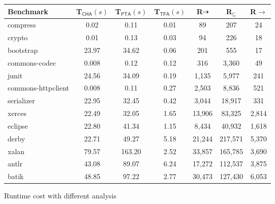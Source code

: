 \documentclass[runningheads]{llncs}
\newcommand{\less}{\sqsubseteq}
\newcommand{\tflow}{\dashrightarrow}
\begin{document}
\begin{figure}[t!]\centering
\begin{tabular}{lcccccc}
	\hline
	\textbf{Benchmark} & \hspace{5pt}\textbf{T$_{\textsf{CHA}}(s)$} & \hspace{5pt}\textbf{T$_{\textsf{PTA}}(s)$} & \hspace{5pt}\textbf{T$_{\textsf{TFA}}(s)$} & \hspace{5pt}\textbf{R${\tflow}$}\hspace{5pt} & \hspace{5pt}\textbf{R$_{\less}$}\hspace{5pt} & \hspace{5pt}\textbf{R${\rightarrow}$} \hspace{2pt}\\
	\hline
	compress & 0.02 & 0.11 & 0.01 & 89 & 207 & 24\\
	crypto & 0.01 & 0.13 & 0.03 & 94 & 226 & 18\\
	bootstrap & 23.97 & 34.62 & 0.06 & 201 & 555 & 17\\
	commons-codec & 0.008 & 0.12 & 0.12 & 316 & 3,360 & 49\\
	junit & 24.56 & 34.09 & 0.19 & 1,135 & 5,977 & 241\\
	commons-httpclient & 0.008 & 0.11 & 0.27 & 2,503 & 8,836 & 521 \\
	serializer & 22.95 & 32.45 & 0.42 & 3,044 & 18,917 & 331\\
	xerces & 22.49 & 32.05 & 1.65 & 13,906 & 83,325 & 2,814\\
	eclipse & 22.80 & 41.34 & 1.15 & 8,434 & 40,932 & 1,618\\
	derby & 22.71 & 49.27 & 5.18 & 21,244 & 217,571 & 5,370\\
	xalan & 79.57 & 163.20 & 2.52 & 33,857 & 165,785 & 3,690\\
	antlr & 43.08 & 89.07 & 6.24 & 17,272 & 112,537 & 3,875\\
	batik & 48.85 & 97.22 & 2.77 & 30,473 & 127,430 & 6,053 \\
	\hline
\end{tabular}
\caption{Runtime cost with different analysis}
\label{experiment:TimeCost}
\end{figure}
\end{document}
